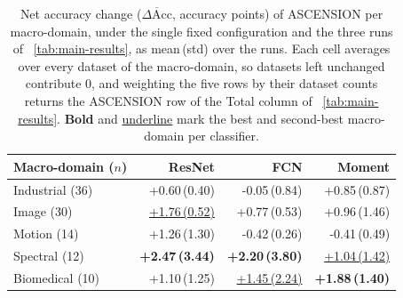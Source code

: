 \begin{table}[!htb]
\centering
\caption{Net accuracy change ($\overline{\Delta\mathrm{Acc}}$, accuracy points) of ASCENSION per macro-domain, under the single fixed configuration and the three runs of \tablename~\ref{tab:main-results}, as mean\,(std) over the runs. Each cell averages over every dataset of the macro-domain, so datasets left unchanged contribute $0$, and weighting the five rows by their dataset counts returns the ASCENSION row of the Total column of \tablename~\ref{tab:main-results}. \textbf{Bold} and \underline{underline} mark the best and second-best macro-domain per classifier.}
\label{Tab:Macro_all}
{\footnotesize
\begin{tabular}{@{}lrrr@{}}
\toprule
\textbf{Macro-domain} ($n$) & \textbf{ResNet} & \textbf{FCN} & \textbf{Moment} \\
\midrule
Industrial (36) & +0.60\,(0.40) & -0.05\,(0.84) & +0.85\,(0.87) \\
Image (30) & \underline{+1.76\,(0.52)} & +0.77\,(0.53) & +0.96\,(1.46) \\
Motion (14) & +1.26\,(1.30) & -0.42\,(0.26) & -0.41\,(0.49) \\
Spectral (12) & \textbf{+2.47\,(3.44)} & \textbf{+2.20\,(3.80)} & \underline{+1.04\,(1.42)} \\
Biomedical (10) & +1.10\,(1.25) & \underline{+1.45\,(2.24)} & \textbf{+1.88\,(1.40)} \\
\bottomrule
\end{tabular}}
\end{table}

